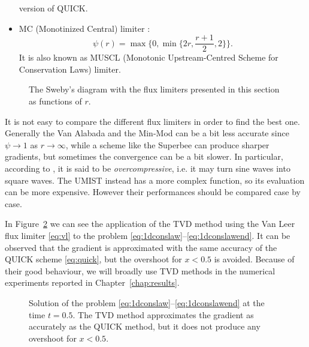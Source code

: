 \begin{itemize}
	version of QUICK.
%
	\item MC (Monotinized Central) limiter \cite{tvd:mclimiter}:
	\begin{equation} \label{eq:mclim}
	\psi(r)=\max \bigg\{0, \min \bigg\{ 2r, \frac{r+1}{2}, 2\bigg\} \bigg\}.
	\end{equation}
	It is also known as MUSCL (Monotonic Upstream-Centred Scheme for 
	Conservation Laws) limiter.
%	
\end{itemize}
\begin{figure}[t]
	\centering
	
	\caption[Flux limiter functions]{The Sweby's diagram with the flux limiters 
	presented in this section as functions of $r$.}
	\label{fig:fluxlimiters}
\end{figure}

It is not easy to compare the different flux limiters in order to find the 
best one. Generally the Van Alabada and the Min-Mod can be a bit less accurate 
since $\psi \rightarrow 1$ as $r \rightarrow \infty$, while a scheme like the 
Superbee can produce sharper gradients, but sometimes the convergence can be a 
bit slower. In particular, according to \cite{tvd:sweeby}, it is said to be \emph{overcompressive}, i.e. it may turn sine waves into square waves. The UMIST instead has a 
more complex function, so its evaluation can be more expensive. However their 
performances should be compared case by case.

In Figure~\ref{fig:1dconslawtvd} we can see the application of the TVD method 
using the Van Leer flux limiter \eqref{eq:vl} to the problem 
\eqref{eq:1dconslaw}--\eqref{eq:1dconslawend}. It can be observed that the 
gradient is approximated with the same accuracy of the QUICK scheme 
\eqref{eq:quick}, but the overshoot for $x<0.5$ is avoided. Because of their 
good behaviour, we will broadly use TVD methods in the numerical experiments 
reported in Chapter~\ref{chap:results}.
\begin{figure}
	\centering
	
	\caption[Solution of a one-dimensional scalar conservation law using a TVD 
	method]{Solution of the problem 
	\eqref{eq:1dconslaw}--\eqref{eq:1dconslawend} at the time 
	$t=0.5$. The TVD method approximates the gradient as accurately as the 
	QUICK method, but it does not produce any overshoot for $x<0.5$.}
	\label{fig:1dconslawtvd}
\end{figure}
%
